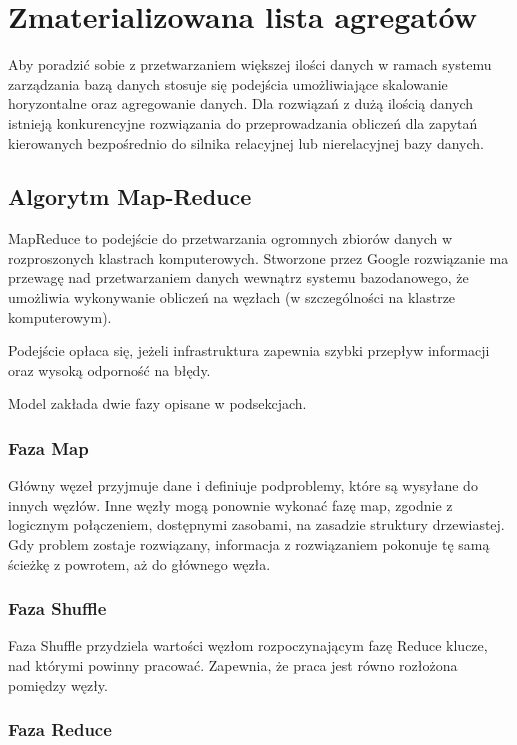 \section{Zmaterializowana lista agregatów}

Aby poradzić sobie z przetwarzaniem większej ilości danych w ramach systemu zarządzania bazą danych stosuje się podejścia umożliwiające skalowanie horyzontalne oraz agregowanie danych. Dla rozwiązań z dużą ilością danych istnieją konkurencyjne rozwiązania do przeprowadzania obliczeń dla zapytań kierowanych bezpośrednio do silnika relacyjnej lub nierelacyjnej bazy danych.

\subsection{Algorytm Map-Reduce}

MapReduce to podejście do przetwarzania ogromnych zbiorów danych w rozproszonych klastrach komputerowych\cite{google-map-reduce}. Stworzone przez Google rozwiązanie ma przewagę nad przetwarzaniem danych wewnątrz systemu bazodanowego, że umożliwia wykonywanie obliczeń na węzłach (w szczególności na klastrze komputerowym).

Podejście opłaca się, jeżeli infrastruktura zapewnia szybki przepływ informacji oraz wysoką odporność na błędy.

Model zakłada dwie fazy opisane w podsekcjach.

\subsubsection{Faza Map}

Główny węzeł przyjmuje dane i definiuje podproblemy, które są wysyłane do innych węzłów. Inne węzły mogą ponownie wykonać fazę map, zgodnie z logicznym połączeniem, dostępnymi zasobami, na zasadzie struktury drzewiastej. Gdy problem zostaje rozwiązany, informacja z rozwiązaniem pokonuje tę samą ścieżkę z powrotem, aż do głównego węzła.

\subsubsection{Faza Shuffle}

Faza Shuffle przydziela wartości węzłom rozpoczynającym fazę Reduce klucze, nad którymi powinny pracować. Zapewnia, że praca jest równo rozłożona pomiędzy węzły.

\subsubsection{Faza Reduce}

